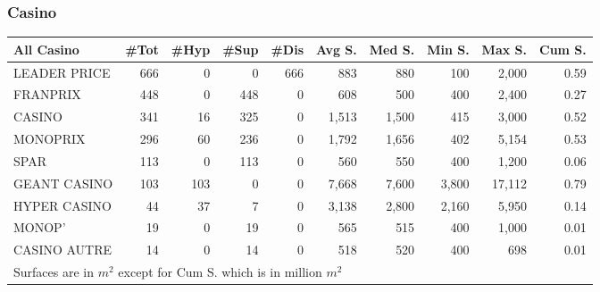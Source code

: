 \documentclass[11pt]{article}
\begin{document}
\subsubsection{Casino}

\begin{table}[H]
\footnotesize
\setlength{\tabcolsep}{2pt}

\begin{tabular}{lrrrrrrrrr}
\toprule
All Casino &       \#Tot &       \#Hyp &       \#Sup &       \#Dis &     Avg S. &     Med S. &     Min S. &     Max S. &     Cum S. \\
\midrule
LEADER PRICE &        666 &          0 &          0 &        666 &        883 &        880 &        100 &      2,000 &       0.59 \\
FRANPRIX     &        448 &          0 &        448 &          0 &        608 &        500 &        400 &      2,400 &       0.27 \\
CASINO       &        341 &         16 &        325 &          0 &      1,513 &      1,500 &        415 &      3,000 &       0.52 \\
MONOPRIX     &        296 &         60 &        236 &          0 &      1,792 &      1,656 &        402 &      5,154 &       0.53 \\
SPAR         &        113 &          0 &        113 &          0 &        560 &        550 &        400 &      1,200 &       0.06 \\
GEANT CASINO &        103 &        103 &          0 &          0 &      7,668 &      7,600 &      3,800 &     17,112 &       0.79 \\
HYPER CASINO &         44 &         37 &          7 &          0 &      3,138 &      2,800 &      2,160 &      5,950 &       0.14 \\
MONOP'       &         19 &          0 &         19 &          0 &        565 &        515 &        400 &      1,000 &       0.01 \\
CASINO AUTRE &         14 &          0 &         14 &          0 &        518 &        520 &        400 &        698 &       0.01 \\
\bottomrule
\multicolumn{10}{l}{\footnotesize Surfaces are in $m^2$ except for Cum S. which is in million $m^2$} \\
\end{tabular}

\end{table}
\end{document}

